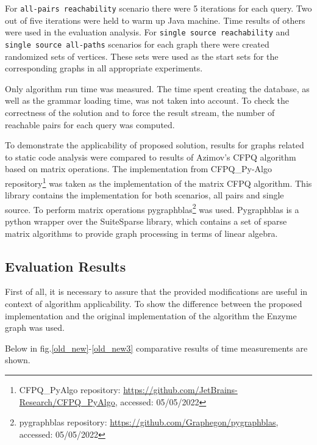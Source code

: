 For \texttt{all-pairs reachability} scenario there were 5 iterations for each query. Two out of five iterations were held to warm up Java machine. Time results of others were used in the evaluation analysis. For \texttt{single source reachability} and \texttt{single source all-paths} scenarios for each graph there were created randomized sets of vertices. These sets were used as the start sets for the corresponding graphs in all appropriate experiments. 

Only algorithm run time was measured. The time spent creating the database, as well as the grammar loading time, was not taken into account. To check the correctness of the solution and to force the result stream, the number of reachable pairs for each query was computed. 

To demonstrate the applicability of proposed solution,  results for graphs related to static code analysis were compared to  results of Azimov's CFPQ algorithm based on matrix operations. The implementation from CFPQ\_Py-Algo repository\footnote{CFPQ\_PyAlgo repository: \url{https://github.com/JetBrains-Research/CFPQ_PyAlgo}, accessed: 05/05/2022} was taken as the implementation of the matrix CFPQ algorithm. This library contains the implementation for both scenarios, all pairs and single source. To perform matrix operations pygraphblas\footnote{pygraphblas repository: \url{https://github.com/Graphegon/pygraphblas}, accessed: 05/05/2022} was used. Pygraphblas is a python wrapper over the SuiteSparse library, which contains a set of sparse matrix algorithms to provide graph processing in terms of linear algebra. 


\subsection{Evaluation Results}

First of all, it is necessary to assure that the provided modifications are useful in context of algorithm applicability.
To show the difference between the proposed implementation and the original implementation of the algorithm the Enzyme graph was used.

Below in fig.\ref{old_new}-\ref{old_new3} comparative results of time measurements are shown.
    
